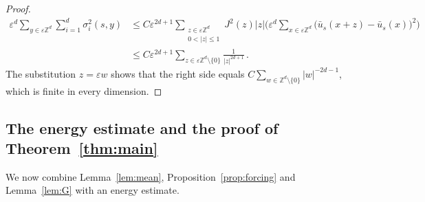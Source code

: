 \documentclass[11pt]{amsart}
\numberwithin{equation}{section}
\newcommand{\Z}{\mathbb{Z}}
\newcommand{\eps}{\varepsilon}
\begin{document}
\begin{proof}
\begin{align*}
    \eps^d \sum_{y \in \eps \Z^d} \sum_{i=1}^d \sigma_i^2(s,y)
    & \leq C \eps^{2d+1} \sum_{\substack{z \in \eps \Z^d \\ 0 < |z| \leq 1}} J^2(z) |z| \biggl( \eps^d \sum_{x \in \eps \Z^d} \bigl( \bar u_s(x + z) - \bar u_s(x) \bigr)^2 \biggr) \\
    & \leq C \eps^{2d+1} \sum_{z \in \eps \Z^d \setminus \{0\}} \frac{1}{|z|^{2d+1}}\,.
\end{align*}
The substitution $z = \eps w$ shows that the right side equals $C \sum_{w \in \Z^d \setminus \{0\}} |w|^{-2d-1}$, which is finite in every dimension.
\end{proof}

\subsection{The energy estimate and the proof of Theorem~\ref{thm:main}} \label{sec:energy}

We now combine Lemma~\ref{lem:mean}, Proposition~\ref{prop:forcing} and Lemma~\ref{lem:G} with an energy estimate.
\end{document}
